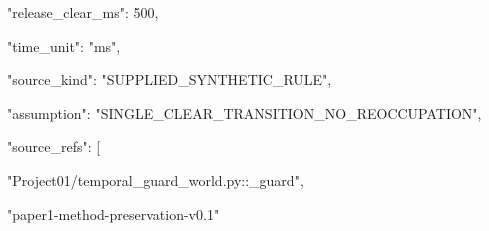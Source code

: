 \documentclass[11pt,a4paper]{article}
\begin{document}
\begin{minipage}{\linewidth}
{\begin{minipage}{\dimexpr\linewidth-2\fboxsep-2\fboxrule\relax}
\noindent{}\hspace{.8em}\parbox[t]{\dimexpr\linewidth-2.8em\relax}{\raggedright\ttfamily\fontsize{8.2}{10.5}\selectfont \hspace*{1.0em}"release\_clear\_ms": 500,\strut}\par\vspace{1pt}
\noindent{}\hspace{.8em}\parbox[t]{\dimexpr\linewidth-2.8em\relax}{\raggedright\ttfamily\fontsize{8.2}{10.5}\selectfont \hspace*{1.0em}"time\_unit": "ms",\strut}\par\vspace{1pt}
\noindent{}\hspace{.8em}\parbox[t]{\dimexpr\linewidth-2.8em\relax}{\raggedright\ttfamily\fontsize{8.2}{10.5}\selectfont \hspace*{1.0em}"source\_kind": "SUPPLIED\_SYNTHETIC\_RULE",\strut}\par\vspace{1pt}
\noindent{}\hspace{.8em}\parbox[t]{\dimexpr\linewidth-2.8em\relax}{\raggedright\ttfamily\fontsize{8.2}{10.5}\selectfont \hspace*{1.0em}"assumption": "SINGLE\_CLEAR\_TRANSITION\_NO\_REOCCUPATION",\strut}\par\vspace{1pt}
\noindent{}\hspace{.8em}\parbox[t]{\dimexpr\linewidth-2.8em\relax}{\raggedright\ttfamily\fontsize{8.2}{10.5}\selectfont \hspace*{1.0em}"source\_refs": [\strut}\par\vspace{1pt}
\noindent{}\hspace{.8em}\parbox[t]{\dimexpr\linewidth-2.8em\relax}{\raggedright\ttfamily\fontsize{8.2}{10.5}\selectfont \hspace*{2.0em}"Project01/temporal\_guard\_world.py::\_guard",\strut}\par\vspace{1pt}
\noindent{}\hspace{.8em}\parbox[t]{\dimexpr\linewidth-2.8em\relax}{\raggedright\ttfamily\fontsize{8.2}{10.5}\selectfont \hspace*{2.0em}"paper1-method-preservation-v0.1"\strut}\par\vspace{1pt}

\end{minipage}}
\end{minipage}
\end{document}
